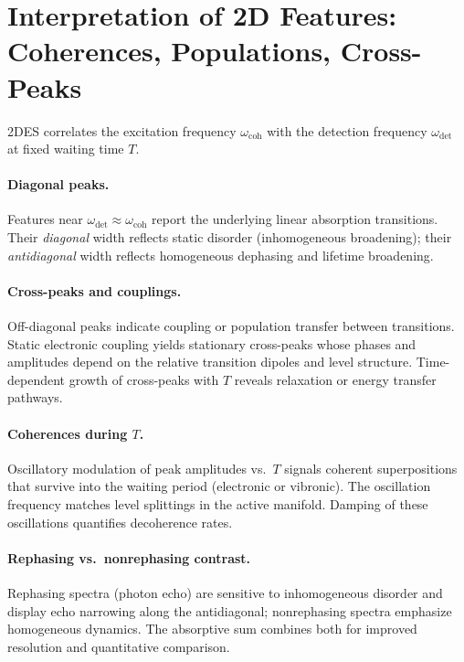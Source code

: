 \section{Interpretation of 2D Features: Coherences, Populations, Cross-Peaks}
\label{final:sec:interpretation}
\noindent
2DES correlates the excitation frequency $\omega_{\mathrm{coh}}$ with the detection frequency $\omega_{\mathrm{det}}$ at fixed waiting time $T$.

\paragraph{Diagonal peaks.}
Features near $\omega_{\mathrm{det}}\!\approx\!\omega_{\mathrm{coh}}$ report the underlying linear absorption transitions. Their \emph{diagonal} width reflects static disorder (inhomogeneous broadening); their \emph{antidiagonal} width reflects homogeneous dephasing and lifetime broadening.

\paragraph{Cross-peaks and couplings.}
Off-diagonal peaks indicate coupling or population transfer between transitions. Static electronic coupling yields stationary cross-peaks whose phases and amplitudes depend on the relative transition dipoles and level structure. Time-dependent growth of cross-peaks with $T$ reveals relaxation or energy transfer pathways.

\paragraph{Coherences during $T$.}
Oscillatory modulation of peak amplitudes vs.\ $T$ signals coherent superpositions that survive into the waiting period (electronic or vibronic). The oscillation frequency matches level splittings in the active manifold. Damping of these oscillations quantifies decoherence rates.

\paragraph{Rephasing vs.\ nonrephasing contrast.}
Rephasing spectra (photon echo) are sensitive to inhomogeneous disorder and display echo narrowing along the antidiagonal; nonrephasing spectra emphasize homogeneous dynamics. The absorptive sum combines both for improved resolution and quantitative comparison.

